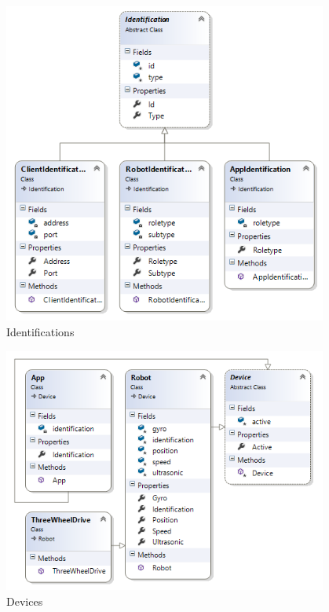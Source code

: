 \begin{figure}[h]
	\begin{center}
		\includegraphics[width=0.95\textwidth]{images/uml/identification.png}
	\end{center}
	\caption{Identifications}
	\label{fig:identification_classdiagram}
\end{figure}

\begin{figure}[h]
	\begin{center}
		\includegraphics[width=0.95\textwidth]{images/uml/devices.png}
	\end{center}
	\caption{Devices}
	\label{fig:devices_classdiagram}
\end{figure}

